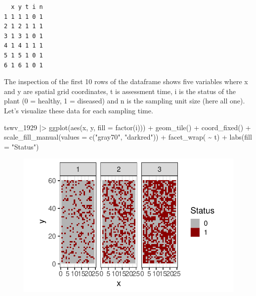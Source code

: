 \documentclass[
  letterpaper,
  DIV=11,
  numbers=noendperiod]{scrreprt}
\newenvironment{Shaded}{\begin{snugshade}}{\end{snugshade}}
\newcommand{\AttributeTok}[1]{\textcolor[rgb]{0.40,0.45,0.13}{#1}}
\newcommand{\FunctionTok}[1]{\textcolor[rgb]{0.28,0.35,0.67}{#1}}
\newcommand{\NormalTok}[1]{\textcolor[rgb]{0.00,0.23,0.31}{#1}}
\newcommand{\SpecialCharTok}[1]{\textcolor[rgb]{0.37,0.37,0.37}{#1}}
\newcommand{\StringTok}[1]{\textcolor[rgb]{0.13,0.47,0.30}{#1}}
\begin{document}
\begin{verbatim}
  x y t i n
1 1 1 1 0 1
2 1 2 1 1 1
3 1 3 1 0 1
4 1 4 1 1 1
5 1 5 1 0 1
6 1 6 1 0 1
\end{verbatim}

The inspection of the first 10 rows of the dataframe shows five
variables where x and y are spatial grid coordinates, t is assessment
time, i is the status of the plant (0 = healthy, 1 = diseased) and n is
the sampling unit size (here all one). Let's visualize these data for
each sampling time.

\begin{Shaded}
\begin{Highlighting}[]
\NormalTok{tswv\_1929 }\SpecialCharTok{|\textgreater{}}
  \FunctionTok{ggplot}\NormalTok{(}\FunctionTok{aes}\NormalTok{(x, y, }\AttributeTok{fill =} \FunctionTok{factor}\NormalTok{(i))) }\SpecialCharTok{+}
  \FunctionTok{geom\_tile}\NormalTok{() }\SpecialCharTok{+}
  \FunctionTok{coord\_fixed}\NormalTok{() }\SpecialCharTok{+}
  \FunctionTok{scale\_fill\_manual}\NormalTok{(}\AttributeTok{values =} \FunctionTok{c}\NormalTok{(}\StringTok{"gray70"}\NormalTok{, }\StringTok{"darkred"}\NormalTok{)) }\SpecialCharTok{+}
  \FunctionTok{facet\_wrap}\NormalTok{( }\SpecialCharTok{\textasciitilde{}}\NormalTok{ t) }\SpecialCharTok{+}
  \FunctionTok{labs}\NormalTok{(}\AttributeTok{fill =} \StringTok{"Status"}\NormalTok{)}
\end{Highlighting}
\end{Shaded}

\begin{figure}[H]

{\centering \includegraphics{./spatial-tests_files/figure-pdf/unnamed-chunk-34-1.pdf}

}

\end{figure}
\end{document}
